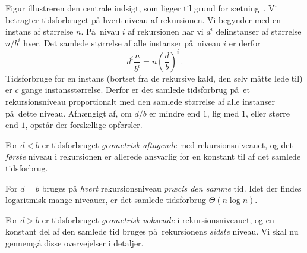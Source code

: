 %
Figur  illustreren den centrale indsigt, som ligger til grund for sætning~.
Vi betragter tidsforbruget på hvert niveau af rekursionen.
Vi begynder med en instans af størrelse $n$.
På nivau $i$ af rekursionen har vi $d^i$ delinstanser af størrelse $n/b^i$ hver.
Det samlede størrelse af alle instanser på niveau $i$ er derfor
\[ d^i \frac{n}{b^i} = n \left( \frac{d}{b} \right)^i \,. \]
Tidsforbruge for en instans (bortset fra de rekursive kald, den selv måtte lede til) er $c$ gange instansstørrelse.
Derfor er det samlede tidsforbrug på et rekursionsniveau proportionalt med den samlede størrelse af alle instanser på dette niveau.
Afhængigt af, om $d/b$ er mindre end $1$, lig med $1$, eller større end $1$, opstår der forskellige opførsler.

For $d<b$ er tidsforbruget \emph{geometrisk aftagende}
med rekursionsniveauet, og det \emph{første} niveau i rekursionen er allerede ansvarlig for en konstant til af det samlede tidsforbrug.

For $d=b$ bruges på \emph{hvert} rekursionsniveau \emph{præcis den samme} tid.
Idet der findes logaritmisk mange niveauer, er det samlede tidsforbrug $\Theta(n\log n)$.

For $d>b$ er tidsforbruget \emph{geometrisk voksende} i rekursionsniveauet, og en konstant del af den samlede tid bruges på rekursionens \emph{sidste} niveau. 
Vi skal nu gennemgå disse overvejelser i detaljer.

